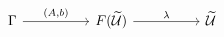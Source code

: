 \[\begin{tikzcd}
	\Gamma && {F(\Tm)} && \Tm
	\arrow["\lambda", from=1-3, to=1-5]
	\arrow["{(A, b)}", from=1-1, to=1-3]
\end{tikzcd}\]